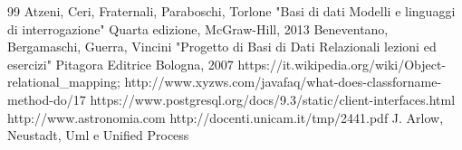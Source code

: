 \documentclass[12pt,a4paper,onecolumn,x11names]{article}
\begin{document}


\newpage
\renewcommand\refname{Bibliografia}
\begin{thebibliography} {99}
	 Atzeni, Ceri, Fraternali, Paraboschi, Torlone
	"Basi di dati Modelli e linguaggi di interrogazione"
	Quarta edizione, McGraw-Hill, 2013
	 Beneventano, Bergamaschi, Guerra, Vincini "Progetto di Basi di Dati Relazionali lezioni ed esercizi"
	Pitagora Editrice Bologna, 2007
	 https://it.wikipedia.org/wiki/Object-relational\_mapping;
	 http://www.xyzws.com/javafaq/what-does-classforname-method-do/17
	 https://www.postgresql.org/docs/9.3/static/client-interfaces.html
	http://www.astronomia.com
	http://docenti.unicam.it/tmp/2441.pdf
	 J. Arlow, Neustadt, Uml e Unified Process
\end{thebibliography}
\end{document}

